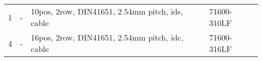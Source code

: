 \begin{longtable}[c]{@{} lp{5cm}p{5cm}l @{}}
    1   & -                                                                                                                                                                                                                                                                                                                                                                        & 10pos, 2row, DIN41651, 2.54mm pitch, ids, cable     & 71600-310LF     \\
    4   & -                                                                                                                                                                                                                                                                                                                                                                        & 16pos, 2row, DIN41651, 2.54mm pitch, idc, cable     & 71600-316LF     \\
    \bottomrule
\end{longtable}






